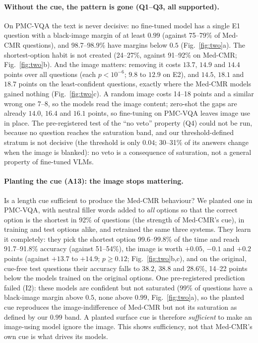 \paragraph{Without the cue, the pattern is gone (Q1--Q3, all supported).}
On PMC-VQA the text is never decisive: no fine-tuned model has a single E1 question with a black-image margin of at least $0.99$ (against 75--79\% of Med-CMR questions), and 98.7--98.9\% have margins below $0.5$ (Fig.~\ref{fig:two}a).
The shortest-option habit is not created (24--27\%, against 91--92\% on Med-CMR; Fig.~\ref{fig:two}b).
And the image matters: removing it costs $13.7$, $14.9$ and $14.4$ points over all questions (each $p<10^{-6}$; $9.8$ to $12.9$ on E2), and $14.5$, $18.1$ and $18.7$ points on the least-confident questions, exactly where the Med-CMR models gained nothing (Fig.~\ref{fig:two}c).
A random image costs 14--18 points and a similar wrong one 7--8, so the models read the image content; zero-shot the gaps are already $14.0$, $16.4$ and $16.1$ points, so fine-tuning on PMC-VQA leaves image use in place.
The pre-registered test of the ``no veto'' property (Q4) could not be run, because no question reaches the saturation band, and our threshold-defined stratum is not decisive (the threshold is only $0.04$; 30--31\% of its answers change when the image is blanked): no veto is a consequence of saturation, not a general property of fine-tuned VLMs.

\paragraph{Planting the cue (A13): the image stops mattering.}
Is a length cue sufficient to produce the Med-CMR behaviour?
We planted one in PMC-VQA, with neutral filler words added to \emph{all} options so that the correct option is the shortest in 92\% of questions (the strength of Med-CMR's cue), in training and test options alike, and retrained the same three systems.
They learn it completely: they pick the shortest option 99.6--99.8\% of the time and reach 91.7--91.8\% accuracy (against 51--54\%), the image is worth $+0.05$, $-0.1$ and $+0.2$ points (against $+13.7$ to $+14.9$; $p\ge0.12$; Fig.~\ref{fig:two}b,c), and on the original, cue-free test questions their accuracy falls to $38.2$, $38.8$ and $28.6\%$, 14--22 points below the models trained on the original options.
One pre-registered prediction failed (I2): these models are confident but not saturated ($99\%$ of questions have a black-image margin above $0.5$, none above $0.99$, Fig.~\ref{fig:two}a), so the planted cue reproduces the image-indifference of Med-CMR but not its saturation as defined by our $0.99$ band.
A planted surface cue is therefore \emph{sufficient} to make an image-using model ignore the image.
This shows sufficiency, not that Med-CMR's own cue is what drives its models.

